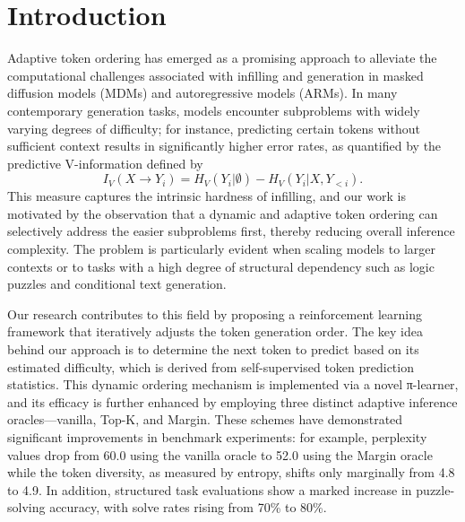 \documentclass{article}
\begin{document}
\section{Introduction}
Adaptive token ordering has emerged as a promising approach to alleviate the computational challenges associated with infilling and generation in masked diffusion models (MDMs) and autoregressive models (ARMs). In many contemporary generation tasks, models encounter subproblems with widely varying degrees of difficulty; for instance, predicting certain tokens without sufficient context results in significantly higher error rates, as quantified by the predictive V-information defined by 
\[
I_V(X \to Y_i) = H_V(Y_i|\emptyset) - H_V(Y_i|X, Y_{<i}).
\]
This measure captures the intrinsic hardness of infilling, and our work is motivated by the observation that a dynamic and adaptive token ordering can selectively address the easier subproblems first, thereby reducing overall inference complexity. The problem is particularly evident when scaling models to larger contexts or to tasks with a high degree of structural dependency such as logic puzzles and conditional text generation.

Our research contributes to this field by proposing a reinforcement learning framework that iteratively adjusts the token generation order. The key idea behind our approach is to determine the next token to predict based on its estimated difficulty, which is derived from self-supervised token prediction statistics. This dynamic ordering mechanism is implemented via a novel π-learner, and its efficacy is further enhanced by employing three distinct adaptive inference oracles—vanilla, Top-K, and Margin. These schemes have demonstrated significant improvements in benchmark experiments: for example, perplexity values drop from 60.0 using the vanilla oracle to 52.0 using the Margin oracle while the token diversity, as measured by entropy, shifts only marginally from 4.8 to 4.9. In addition, structured task evaluations show a marked increase in puzzle-solving accuracy, with solve rates rising from 70\% to 80\%.
\end{document}
